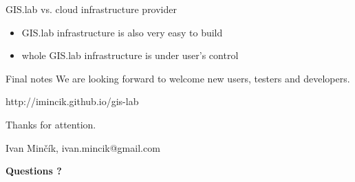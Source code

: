 \documentclass[12pt]{beamer}
\begin{document}
\begin{frame}{GIS.lab vs. cloud infrastructure provider}
	\begin{itemize}[<+->]
		\item GIS.lab infrastructure is also very easy to build 
		\item whole GIS.lab infrastructure is under user's control
	\end{itemize}
\end{frame}


\begin{frame}{Final notes}
	We are looking forward to welcome new users, testers and developers.
	
	\bigskip
	http://imincik.github.io/gis-lab
	
	\bigskip
	Thanks for attention.
	
	Ivan Minčík, ivan.mincik@gmail.com

	\bigskip 
	\LARGE\textbf{Questions ?}
\end{frame}


\end{document}
